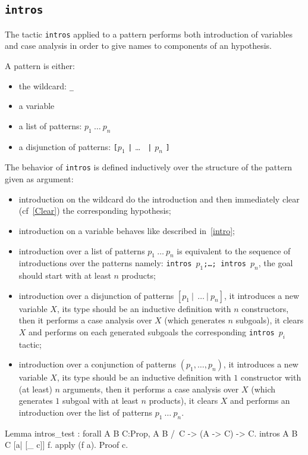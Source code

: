 \subsection{\tt intros \pattern}\label{intros-pattern}

The tactic {\tt intros} applied to a pattern performs both
introduction of variables and case analysis in order to give names to
components of an hypothesis.

A pattern is either:
\begin{itemize}
\item the wildcard: {\tt \_}
\item a variable
\item a list of patterns: $p_1~\ldots~p_n$
\item a disjunction of patterns: {\tt [}$p_1$ {\tt |} {\ldots} {\tt
|} $p_n$ {\tt ]}
\end{itemize}

The behavior of \texttt{intros} is defined inductively over the
structure of the pattern given as argument:
\begin{itemize}
\item introduction on the wildcard do the introduction and then
  immediately clear (cf~\ref{Clear}) the corresponding hypothesis;
\item introduction on a variable behaves like described in~\ref{intro}; 
\item introduction over a
list of patterns $p_1~\ldots~p_n$ is equivalent to the sequence of
introductions over the patterns namely:
\texttt{intros $p_1$;\ldots; intros $p_n$}, the goal should start with
at least $n$ products;
\item introduction over a
disjunction of patterns $[p_1~|~~\ldots~|~p_n]$, it 
introduces a new variable $X$, its type should be an inductive
definition with $n$
constructors, then it performs a case analysis over $X$ 
(which generates $n$ subgoals), it 
clears $X$ and performs on each generated subgoals the corresponding
\texttt{intros}~$p_i$ tactic;
\item introduction over a 
conjunction  of patterns $(p_1,\ldots,p_n)$, it
introduces a new variable $X$, its type should be an inductive 
definition with $1$
constructor with (at least) $n$ arguments, then it performs a case 
analysis over $X$ 
(which generates $1$ subgoal with at least $n$ products), it 
clears $X$ and performs an introduction over the list of patterns $p_1~\ldots~p_n$.
\end{itemize}
\begin{coq_example}
Lemma intros_test : forall A B C:Prop, A \/ B /\ C -> (A -> C) -> C.
intros A B C [a| [_ c]] f.
apply (f a).
Proof c.
\end{coq_example}

